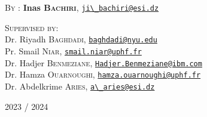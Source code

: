 {\begin{titlepage}
     \begin{flushright} \large
       \textsc{By :}  \textbf{Inas \textsc{Bachiri}}, \href{mailto:ji\_bachiri@esi.dz}{\verb!ji\_bachiri@esi.dz!}\\[0.1cm]
    \end{flushright}
    
    \vspace{7mm}

      \begin{flushleft} \large
          \textsc{Supervised by:} \\
          \newline
          {
          Dr. Riyadh \textsc{Baghdadi}, \href{mailto:baghdadi@nyu.edu}{\verb!baghdadi@nyu.edu!}\\[0.1cm]
          Pr. Smail \textsc{Niar}, \href{mailto:smail.niar@uphf.fr}{\verb!smail.niar@uphf.fr!}\\[0.1cm]
          Dr. Hadjer \textsc{Benmeziane}, \href{mailto:Hadjer.Benmeziane@ibm.com}{\verb!Hadjer.Benmeziane@ibm.com!}\\[0.1cm]
          Dr. Hamza \textsc{Ouarnoughi}, \href{mailto:hamza.ouarnoughi@uphf.fr}{\verb!hamza.ouarnoughi@uphf.fr!}\\[0.1cm]
          Dr. Abdelkrime \textsc{Aries}, \href{mailto:a\_aries@esi.dz}{\verb!a\_aries@esi.dz!}
          }
      \end{flushleft}

    \vfill

    {\large 2023 / 2024}
  \end{titlepage}
  \restoregeometry
}